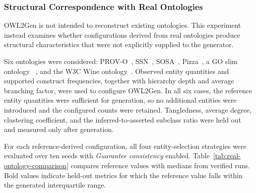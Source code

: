 \subsubsection{Structural Correspondence with Real Ontologies}
\label{sec:owl2gen_real_ontologies}

OWL2Gen is not intended to reconstruct existing ontologies. This experiment
instead examines whether configurations derived from real ontologies produce
structural characteristics that were not explicitly supplied to the
generator.

Six ontologies were considered: PROV-O~\cite{provo},
SSN~\cite{ssn-sosa}, SOSA~\cite{ssn-sosa,sosa-journal},
Pizza~\cite{pizza-ontology}, a GO slim ontology
~\cite{geneontology2000,geneontology}, and the W3C Wine
ontology~\cite{owlguide}. Observed entity quantities and supported construct
frequencies, together with hierarchy depth and average branching factor, were
used to configure OWL2Gen. In all six cases, the reference entity quantities
were sufficient for generation, so no additional entities were introduced
and the configured counts were retained. Tangledness, average degree,
clustering coefficient, and the inferred-to-asserted subclass ratio were held
out and measured only after generation.

For each reference-derived configuration, all four entity-selection
strategies were evaluated over ten seeds with \emph{Guarantee consistency}
enabled. Table~\ref{tab:real-ontology-comparison} compares reference values
with medians from verified runs. Bold values indicate held-out metrics for
which the reference value falls within the generated interquartile range.

